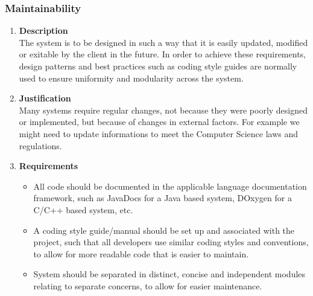 \documentclass[a4paper,10pt]{article}
\begin{document}
\subsubsection{Maintainability}
\begin{enumerate}
\item \textbf{Description} \\
The system is to be designed in such a way that it is easily updated, modified or exitable by the client in the future. In order to achieve these requirements, design patterns and best practices such as coding style guides are normally used to ensure uniformity and modularity across the system.
\item \textbf{Justification} \\
Many systems require regular changes, not because they were poorly designed or implemented, but because of changes in external factors. For example we might need to update informations to meet the Computer Science laws and regulations.
\item \textbf{Requirements}
	\begin{itemize}
		\item All code should be documented in the applicable language documentation framework, such as JavaDocs for a Java based system, DOxygen for a C/C++ based system, etc.
		\item A coding style guide/manual should be set up and associated with the project, such that all developers use similar coding styles and conventions, to allow for more readable code that is easier to maintain.
		\item System should be separated in distinct, concise and independent modules relating to separate concerns, to allow for easier maintenance.
	\end{itemize}
\end{enumerate}
\end{document}
